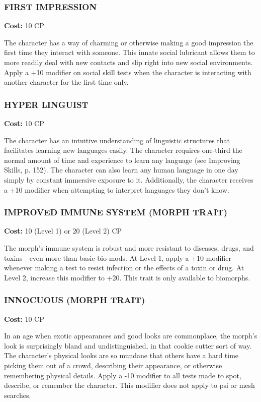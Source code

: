 \subsubsection{FIRST IMPRESSION}
\textbf{Cost:} 10 CP

The character has a way of charming or otherwise making a good impression the
first time they interact with someone. This innate social lubricant allows them
to more readily deal with new contacts and slip right into new social
environments. Apply a +10 modifier on social skill tests when the character is
interacting with another character for the first time only.

\subsubsection{HYPER LINGUIST}
\textbf{Cost:} 10 CP

The character has an intuitive understanding of linguistic structures that
facilitates learning new languages easily. The character requires one-third the
normal amount of time and experience to learn any language (see Improving
Skills, p. 152). The character can also learn any human language in one day
simply by constant immersive exposure to it. Additionally, the character
receives a +10 modifier when attempting to interpret languages they don’t know.

\subsubsection{IMPROVED IMMUNE SYSTEM (MORPH TRAIT)}
\textbf{Cost:} 10 (Level 1) or 20 (Level 2) CP

The morph’s immune system is robust and more resistant to diseases, drugs, and
toxins—even more than basic bio-mods. At Level 1, apply a +10 modifier whenever
making a test to resist infection or the effects of a toxin or drug. At Level
2, increase this modifier to +20. This trait is only available to biomorphs.

\subsubsection{INNOCUOUS (MORPH TRAIT)}
\textbf{Cost:} 10 CP

In an age when exotic appearances and good looks are commonplace, the morph’s
look is surprisingly bland and undistinguished, in that cookie cutter sort of
way. The character’s physical looks are so mundane that others have a hard time
picking them out of a crowd, describing their appearance, or otherwise
remembering physical details. Apply a -10 modifier to all tests made to spot,
describe, or remember the character. This modifier does not apply to psi or
mesh searches.

